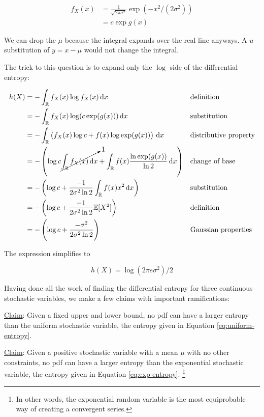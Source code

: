 \documentclass[13pt,oneside]{tufte-book}
\theoremstyle{definition}
\theoremstyle{definition}
\theoremstyle{definition}
\theoremstyle{remark}
\begin{document}
\begin{align*}
f_X(x) &= \frac{1}{\sqrt{2\pi\sigma^2}}\exp(-x^2/(2\sigma^2)) \\
&= c \exp g(x)
\end{align*}

We can drop the \(\mu\) because the integral expands over the real line
anyways. A \(u\)-substitution of \(y=x-\mu\) would not change the
integral.

The trick to this question is to expand only the \(\log\) side of the
differential entropy:

\begin{align*}
h(X) &= - \int_{\mathbb{R}} f_X(x) \log f_X(x)\,\mathrm{d}x && \text{definition} \\
&= - \int_{\mathbb{R}} f_X(x) \log(c\exp(g(x))) \,\mathrm{d}x && \text{substitution} \\
&= - \int_{\mathbb{R}} \left( f_X(x)  \log c + f(x) \log \exp(g(x)) \right) \,\mathrm{d}x && \text{distributive property} \\
&= - \left( \log c \cancelto{1}{\int_{\mathbb{R}}  f_X(x)   \,\mathrm{d}x }  + \int_{\mathbb{R}} f(x) \frac{\ln \exp(g(x))}{\ln 2}\,\mathrm{d}x \right)&& \text{change of base} \\
&= - \left( \log c + \frac{-1}{2\sigma^2\ln 2}\int_{\mathbb{R}} f(x) x^2 \,\mathrm{d}x \right) && \text{substitution} \\
&= - \left( \log c + \frac{-1}{2\sigma^2\ln 2}\mathbb{E}[X^2] \right) && \text{definition} \\
&= - \left( \log c + \frac{-\sigma^2}{2\sigma^2\ln 2} \right) && \text{Gaussian properties} 
\end{align*}

The expression simplifies to

\begin{equation}
h(X) = \log(2\pi e \sigma^2)/2
\label{eq:gauss-entropy}
\end{equation}

Having done all the work of finding the differential entropy for three
continuous stochastic variables, we make a few claims with important
ramifications:

\underline{Claim}: Given a fixed upper and lower bound, no pdf can have
a larger entropy than the uniform stochastic variable, the entropy given
in Equation \eqref{eq:uniform-entropy}.

\underline{Claim}: Given a positive stochastic variable with a mean
\(\mu\) with no other constraints, no pdf can have a larger entropy than
the exponential stochastic variable, the entropy given in Equation
\eqref{eq:exp-entropy}. \footnote{In other words, the exponential random
  variable is the most equiprobable way of creating a convergent series.}
\end{document}
